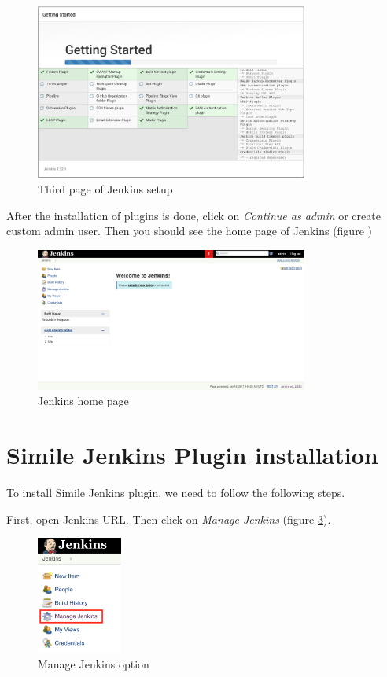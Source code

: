 \begin{figure}[H]
	\centering
    \includegraphics[width=0.8\textwidth]{grafiken/jenkins-03}
    \caption{Third page of Jenkins setup}
    \label{fig:jenkins-03}
\end{figure}

After the installation of plugins is done, click on \textit{Continue as admin} or create custom admin user. Then you should see the home page of Jenkins (figure )

\begin{figure}[H]
	\centering
    \includegraphics[width=0.8\textwidth]{grafiken/jenkins-04}
    \caption{Jenkins home page}
    \label{fig:jenkins-04}
\end{figure}

\section{Simile Jenkins Plugin installation}
To install Simile Jenkins plugin, we need to follow the following steps.

First, open Jenkins URL. Then click on \textit{Manage Jenkins} (figure \ref{fig:jenkins-plugin-01}).

\begin{figure}[H]
	\centering
    \includegraphics[width=0.25\textwidth]{grafiken/jenkins-plugin-01}
    \caption{Manage Jenkins option}
    \label{fig:jenkins-plugin-01}
\end{figure}


